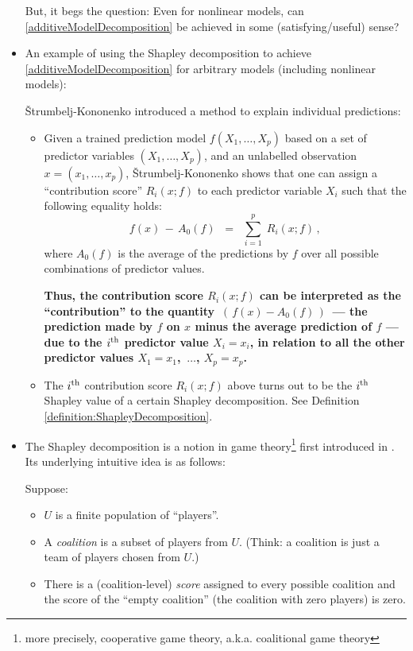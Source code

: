 \begin{itemize}
	But, it begs the question: Even for nonlinear models, can \eqref{additiveModelDecomposition}
	be achieved in some (satisfying/useful) sense?

\item
	An example of using the Shapley decomposition to achieve \eqref{additiveModelDecomposition}
	for arbitrary models (including nonlinear models):
	
	\v{S}trumbelj-Kononenko \cite{Strumbelj2010}
	introduced a method to {\color{red}explain individual predictions}:
	\begin{itemize}
	\item
		Given a trained prediction model $f(X_{1},\ldots,X_{p})$
		based on a set of predictor variables $(X_{1},\ldots,X_{p})$, and
		an unlabelled observation $x = (x_{1},\ldots,x_{p})$,
		\v{S}trumbelj-Kononenko \cite{Strumbelj2010} shows that
		one can assign a ``contribution score'' $R_{i}(x;f)$
		to each predictor variable $X_{i}$
		such that the following equality holds:
		\begin{equation*}
		f(x) \, - \, A_{0}(f)
		\;\; = \;\;
			\overset{p}{\underset{i=1}{\sum}}\;
			R_{i}(x;f)\,,
		\end{equation*}
		where $A_{0}(f)$ is the average of the predictions by $f$
		over all possible combinations of predictor values.

		\vskip 0.2cm
		\textbf{Thus, the contribution score $R_{i}(x;f)$ can be interpreted
		as the ``{\color{red}contribution}'' to the quantity \,$\left(\,f(x) - A_{0}(f)\,\right)$\,
		 --- the prediction made by $f$ on $x$ minus the average prediction of $f$ ---
		due to the $i^{\textnormal{th}}$ predictor value $X_{i} = x_{i}$,
		in relation to all the other predictor values
		$X_{1} = x_{1}$, \,$\ldots$\;, $X_{p} = x_{p}$.}
		\vskip 0.2cm
		
	\item
		The $i^{\textnormal{th}}$ contribution score $R_{i}(x;f)$ above
		turns out to be the $i^{\textnormal{th}}$ {\color{red}Shapley value} of
		a certain {\color{red}Shapley decomposition}.
		See Definition \eqref{definition:ShapleyDecomposition}.
	\end{itemize}

\item
	The Shapley decomposition is a notion
	in game theory\footnote{more precisely, cooperative game theory, a.k.a. coalitional game theory}
	first introduced in \cite{Shapley1953}.
	Its underlying intuitive idea is as follows:

	Suppose:
	\begin{itemize}
	\item
		$U$ is a finite population of ``players''.
	\item
		A \textit{coalition} is a subset of players from $U$.
		(Think: a coalition is just a team of players chosen from $U$.)
	\item
		There is a (coalition-level) \textit{score} assigned to every possible coalition
		and the score of the ``empty coalition'' (the coalition with zero players) is zero.
	\end{itemize}
	

\end{itemize}
